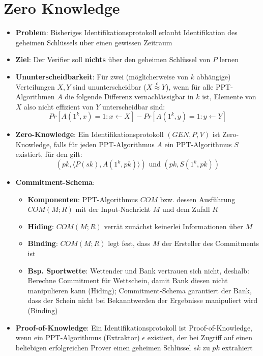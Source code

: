\section{Zero Knowledge}%
\label{zknow:sec:zero_knowledge}

\begin{itemize}
	\item \textbf{Problem}: Bisheriges Identifikationsprotokoll erlaubt Identifikation des geheimen Schlüssels über einen gewissen Zeitraum
	\item \textbf{Ziel}: Der Verifier soll \textbf{nichts} über den geheimen Schlüssel von $P$ lernen
	\item \textbf{Ununterscheidbarkeit}: Für zwei (möglicherweise von $k$ abhängige) Verteilungen $X, Y$ sind ununterscheidbar ($X \stackrel{c}{\approx} Y$), wenn für alle PPT-Algorithmen $A$ die folgende Differenz vernachlässigbar in $k$ ist, Elemente von $X$ also nicht effizient von $Y$ unterscheidbar sind:
	$$
		Pr[A(1^k, x) = 1 : x \leftarrow X] - Pr[A(1^k, y) = 1 : y \leftarrow Y]
	$$
	\item \textbf{Zero-Knowledge}: Ein Identifikationsprotokoll $(GEN, P, V)$ ist Zero-Knowledge, falls für jeden PPT-Algorithmus $A$ ein PPT-Algorithmus $S$ existiert, für den gilt:
	$$
		(pk, \langle P(sk), A(1^k, pk)\rangle) \text{ und } (pk, S(1^k, pk))
	$$
	\item \textbf{Commitment-Schema}:
	\begin{itemize}
		\item \textbf{Komponenten}: PPT-Algorithmus $COM$ bzw. dessen Ausführung $COM(M; R)$ mit der Input-Nachricht $M$ und dem Zufall $R$
		\item \textbf{Hiding}: $COM(M; R)$ verrät zunächst keinerlei Informationen über $M$
		\item \textbf{Binding}: $COM(M; R)$ legt fest, dass $M$ der Ersteller des Commitments ist
		\item \textbf{Bsp. Sportwette}: Wettender und Bank vertrauen sich nicht, deshalb: Berechne Commitment für Wettschein, damit Bank diesen nicht manipulieren kann (Hiding); Commitment-Schema garantiert der Bank, dass der Schein nicht bei Bekanntwerden der Ergebnisse manipuliert wird (Binding)
	\end{itemize}
	\item \textbf{Proof-of-Knowledge}: Ein Identifikationsprotokoll ist Proof-of-Knowledge, wenn ein PPT-Algorithmus (Extraktor) $\epsilon$ existiert, der bei Zugriff auf einen beliebigen erfolgreichen Prover einen geheimen Schlüssel $sk$ zu $pk$ extrahiert
\end{itemize}